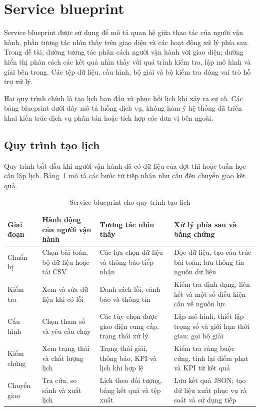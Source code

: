 \section{Service blueprint}
\label{sec:blueprint}

Service blueprint được sử dụng để mô tả quan hệ giữa thao tác của người vận hành, phần tương tác nhìn thấy trên giao diện và các hoạt động xử lý phía sau. Trong đề tài, đường tương tác phân cách người vận hành với giao diện; đường hiển thị phân cách các kết quả nhìn thấy với quá trình kiểm tra, lập mô hình và giải bên trong. Các tệp dữ liệu, cấu hình, bộ giải và bộ kiểm tra đóng vai trò hỗ trợ xử lý.

Hai quy trình chính là tạo lịch ban đầu và phục hồi lịch khi xảy ra sự cố. Các bảng blueprint dưới đây mô tả luồng dịch vụ, không hàm ý hệ thống đã triển khai kiến trúc dịch vụ phân tán hoặc tích hợp các đơn vị bên ngoài.

\subsection{Quy trình tạo lịch}
\label{subsec:blueprint-tao-lich}

Quy trình bắt đầu khi người vận hành đã có dữ liệu của đợt thi hoặc tuần học cần lập lịch. Bảng~\ref{tab:blueprint-tao-lich} mô tả các bước từ tiếp nhận nhu cầu đến chuyển giao kết quả.

\begin{table}[htbp]
    \centering
    \caption{Service blueprint cho quy trình tạo lịch}
    \label{tab:blueprint-tao-lich}
    \scriptsize
    \begin{tabularx}{\textwidth}{@{}p{}XXX@{}}
        \toprule
        Giai đoạn & Hành động của người vận hành & Tương tác nhìn thấy & Xử lý phía sau và bằng chứng \\
        \midrule
        Chuẩn bị & Chọn bài toán, bộ dữ liệu hoặc tải CSV & Các lựa chọn dữ liệu và thông báo tiếp nhận & Đọc dữ liệu, tạo cấu trúc bài toán; lưu thông tin nguồn dữ liệu \\
        \addlinespace
        Kiểm tra & Xem và sửa dữ liệu khi có lỗi & Danh sách lỗi, cảnh báo và thông tin & Kiểm tra định dạng, liên kết và một số điều kiện cần về nguồn lực \\
        \addlinespace
        Cấu hình & Chọn tham số và yêu cầu chạy & Các tùy chọn được giao diện cung cấp, trạng thái xử lý & Lập mô hình, thiết lập trọng số và giới hạn thời gian; gọi bộ giải \\
        \addlinespace
        Kiểm chứng & Xem trạng thái và chất lượng lịch & Trạng thái giải, thông báo, KPI và lịch khi hợp lệ & Kiểm tra ràng buộc cứng, tính lại điểm phạt và KPI từ kết quả \\
        \addlinespace
        Chuyển giao & Tra cứu, so sánh và xuất lịch & Lịch theo đối tượng, bảng kết quả và tệp xuất & Lưu kết quả JSON; tạo dữ liệu xuất phục vụ rà soát và sử dụng tiếp \\
        \bottomrule
    \end{tabularx}
\end{table}

